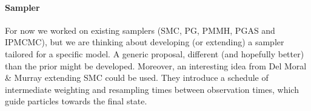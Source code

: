 \paragraph{Sampler}
For now we worked on existing samplers (\gls{SMC}, \gls{PG}, \gls{PMMH}, \gls{PGAS} and \gls{IPMCMC}), but we are thinking about developing (or extending) a sampler tailored for a specific model. A generic proposal, different (and hopefully better) than the prior might be developed.
Moreover, an interesting idea from Del Moral \& Murray \cite{DelMoral:2015jk} extending \gls{SMC} could be used. They introduce a schedule of intermediate weighting and resampling times between observation times, which guide particles towards the final state.
